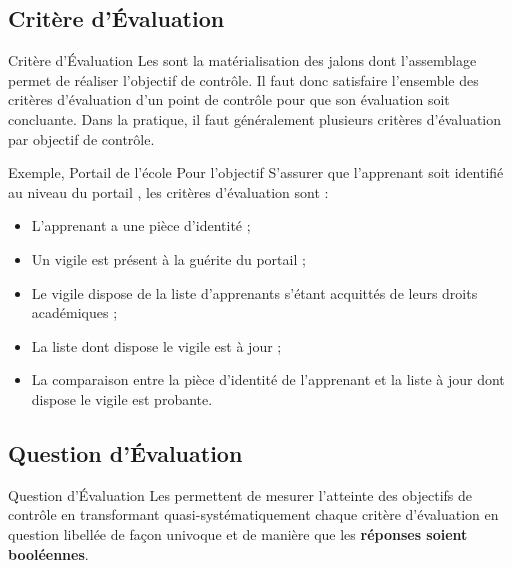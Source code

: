 \subsection{Critère d'Évaluation}

\begin{boxdef}{Critère d'Évaluation}
Les  sont la matérialisation des jalons dont
l'assemblage permet de réaliser l'objectif de contrôle. Il faut donc satisfaire
l'ensemble des critères d'évaluation d'un point de contrôle pour que son évaluation
soit concluante. Dans la pratique, il faut généralement plusieurs critères d'évaluation
par objectif de contrôle.
\end{boxdef}

\begin{boxlizbiz}{Exemple, Portail de l'école}
Pour l'objectif \og S'assurer que l'apprenant soit identifié au niveau du portail \fg{},
les critères d'évaluation sont :
\begin{itemize}
  \item L'apprenant a une pièce d'identité ;
  \item Un vigile est présent à la guérite du portail ;
  \item Le vigile dispose de la liste d'apprenants s'étant acquittés de leurs droits
    académiques ;
  \item La liste dont dispose le vigile est à jour ;
  \item La comparaison entre la pièce d'identité de l'apprenant et la liste à jour dont
    dispose le vigile est probante.
\end{itemize}
\end{boxlizbiz}

\subsection{Question d'Évaluation}

\begin{boxdef}{Question d'Évaluation}
Les  permettent de mesurer l'atteinte des objectifs
de contrôle en transformant quasi-systématiquement chaque critère d'évaluation en
question libellée de façon univoque et de manière que les \textbf{réponses soient
booléennes}.
\end{boxdef}

